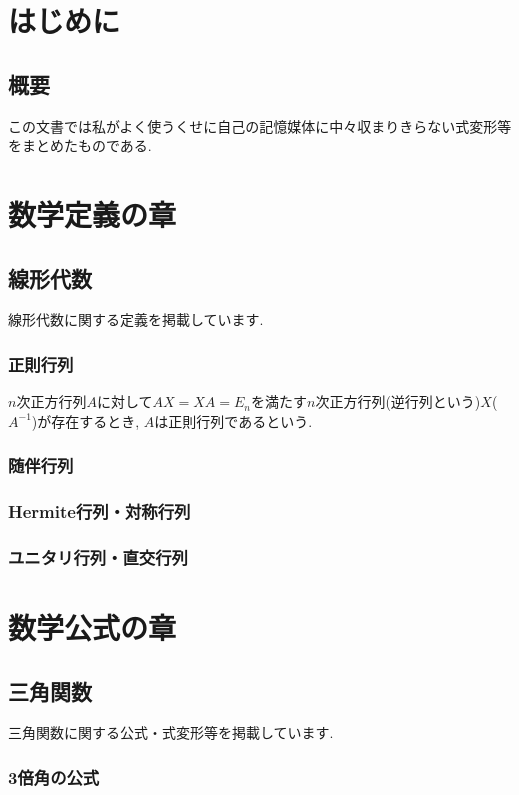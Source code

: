 \documentclass[]{jreport}
\begin{document}
\part{はじめに}
\chapter{概要}

この文書では私がよく使うくせに自己の記憶媒体に中々収まりきらない式変形等をまとめたものである.

\part{数学定義の章}
\chapter{線形代数}

線形代数に関する定義を掲載しています.

\section{正則行列}

$n$次正方行列$A$に対して$AX=XA=E_n$を満たす$n$次正方行列(逆行列という)$X$($A^{-1}$)が存在するとき, $A$は正則行列であるという.

\section{随伴行列}

\section{Hermite行列・対称行列}

\section{ユニタリ行列・直交行列}

\part{数学公式の章}
\chapter{三角関数}

三角関数に関する公式・式変形等を掲載しています.

\section{3倍角の公式}
\end{document}
